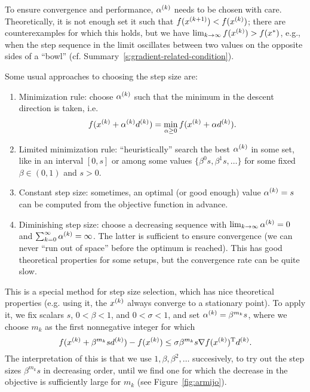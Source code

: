\documentclass{article}
\begin{document}
\label{s:step-size-selection}

To ensure convergence and performance, \(\kth{\alpha}\) needs to be chosen with care.
Theoretically, it is not enough set it such that \(f(\kth[k+1]{x}) < f(\kth{x})\); there are
counterexamples for which this holds, but we have \(\lim_{k \to \infty} f(\kth{x}) > f(x^*)\), e.g.,
when the step sequence in the limit oscillates between two values on the opposite sides of a
``bowl'' (cf. Summary~\ref{s:gradient-related-condition}).

Some usual approaches to choosing the step size are:
\begin{enumerate}
\item Minimization rule: choose \(\kth{\alpha}\) such that the minimum in the descent direction is
  taken, i.e.
  \begin{equation*}
    f(\kth{x} + \kth{\alpha}\kth{d}) = \min_{\alpha \geq 0} f(\kth{x} + \alpha\kth{d}).
  \end{equation*}
\item Limited minimization rule: ``heuristically'' search the best \(\kth{\alpha}\) in some set,
  like in an interval \([0, s]\) or among some values \(\{\beta^0 s, \beta^1 s, \ldots \}\) for some
  fixed \(\beta \in (0, 1)\) and \(s > 0\).
\item Constant step size: sometimes, an optimal (or good enough) value \(\kth{\alpha} = s\) can be
  computed from the objective function in advance.
\item Diminishing step size: choose a decreasing sequence with
  \(\lim_{k \to \infty} \kth{\alpha} = 0\) and \(\sum_{k = 0}^{\infty} \kth{\alpha} = \infty\).  The
  latter is sufficient to ensure convergence (we can never ``run out of space'' before the optimum
  is reached).  This has good theoretical properties for some setups, but the convergence rate can
  be quite slow.
\end{enumerate}


\label{s:armijo-rule}

This is a special method for step size selection, which has nice theoretical properties (e.g. using
it, the \(\kth{x}\) always converge to a stationary point).  To apply it, we fix scalars \(s\), \(0 <
\beta < 1\), and \(0 < \sigma < 1\), and set \(\kth{\alpha} = \beta^{m_k} s\), where we choose
\(m_k\) as the first nonnegative integer for which
\begin{equation*}
  f(\kth{x} + \beta^{m_k} s \kth{d}) - f(\kth{x}) \leq \sigma \beta^{m_k} s \nabla \T{f(\kth{x})} \kth{d}.
\end{equation*}
The interpretation of this is that we use \(1, \beta, \beta^2, \ldots\) succesively, to try out the
step sizes \(\beta^{m_k} s\) in decreasing order, until we find one for which the decrease in the
objective is sufficiently large for \(m_k\) (see Figure~\ref{fig:armijo}).
\end{document}
